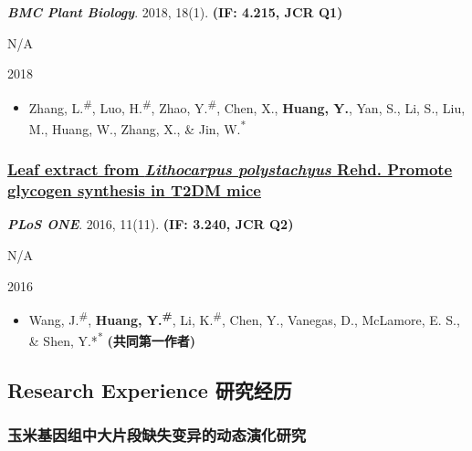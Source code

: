 \documentclass[]{article}
\providecommand{\tightlist}{%
  \setlength{\itemsep}{0pt}\setlength{\parskip}{0pt}}
\begin{document}
\textbf{\emph{BMC Plant Biology}}. 2018, 18(1). \textbf{(IF: 4.215, JCR
Q1)}

N/A

2018

\begin{itemize}
\tightlist
\item
  Zhang, L.\textsuperscript{\#}, Luo, H.\textsuperscript{\#}, Zhao,
  Y.\textsuperscript{\#}, Chen, X., \textbf{Huang, Y.}, Yan, S., Li, S.,
  Liu, M., Huang, W., Zhang, X., \& Jin, W.\textsuperscript{*}
\end{itemize}

\hypertarget{leaf-extract-from-lithocarpus-polystachyus-rehd.-promote-glycogen-synthesis-in-t2dm-mice}{%
\subsubsection{\texorpdfstring{\href{https://dx.doi.org/10.1371/journal.pone.0166557}{Leaf
extract from \emph{Lithocarpus polystachyus} Rehd. Promote glycogen
synthesis in T2DM
mice}}{Leaf extract from Lithocarpus polystachyus Rehd. Promote glycogen synthesis in T2DM mice}}\label{leaf-extract-from-lithocarpus-polystachyus-rehd.-promote-glycogen-synthesis-in-t2dm-mice}}

\textbf{\emph{PLoS ONE}}. 2016, 11(11). \textbf{(IF: 3.240, JCR Q2)}

N/A

2016

\begin{itemize}
\tightlist
\item
  Wang, J.\textsuperscript{\#}, \textbf{Huang, Y.\textsuperscript{\#}},
  Li, K.\textsuperscript{\#}, Chen, Y., Vanegas, D., McLamore, E. S., \&
  Shen, Y.*\textsuperscript{*} \textbf{(共同第一作者)}
\end{itemize}

\hypertarget{research-experience-ux7814ux7a76ux7ecfux5386}{%
\subsection{Research Experience
研究经历}\label{research-experience-ux7814ux7a76ux7ecfux5386}}

\hypertarget{ux7389ux7c73ux57faux56e0ux7ec4ux4e2dux5927ux7247ux6bb5ux7f3aux5931ux53d8ux5f02ux7684ux52a8ux6001ux6f14ux5316ux7814ux7a76}{%
\subsubsection{玉米基因组中大片段缺失变异的动态演化研究}\label{ux7389ux7c73ux57faux56e0ux7ec4ux4e2dux5927ux7247ux6bb5ux7f3aux5931ux53d8ux5f02ux7684ux52a8ux6001ux6f14ux5316ux7814ux7a76}}
\end{document}
